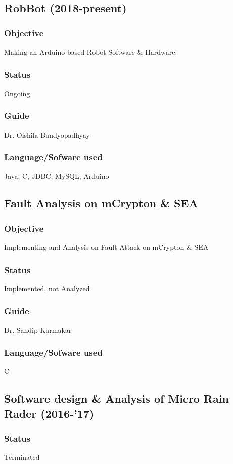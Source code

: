 \documentclass{article}
\begin{document}
\subsection{RobBot (2018-present)}
\subsubsection{Objective} Making an Arduino-based Robot Software \& Hardware
\subsubsection{Status} Ongoing
\subsubsection{Guide} Dr. Oishila Bandyopadhyay
\subsubsection{Language/Sofware used} Java, C, JDBC, MySQL, Arduino

\subsection{Fault Analysis on mCrypton \& SEA}
\subsubsection{Objective} Implementing and Analysis on Fault Attack on mCrypton \& SEA
\subsubsection{Status} Implemented, not Analyzed
\subsubsection{Guide} Dr. Sandip Karmakar
\subsubsection{Language/Sofware used} C

\subsection{Software design \& Analysis of Micro Rain Rader (2016-'17)}
\subsubsection{Status}	Terminated
\end{document}
